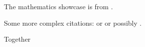 \documentclass{article}
\begin{document}
The mathematics showcase is from \autocite{Graham1995}.

Some more complex citations: \parencite{Graham1995} or
\textcite{Thomas2008} or possibly .

\autocite[56]{Thomas2008}

\autocite[See][45-48]{Graham1995}

Together \autocite{Thomas2008,Graham1995}

\cite{Thomas2008}

\printbibliography
\end{document}
